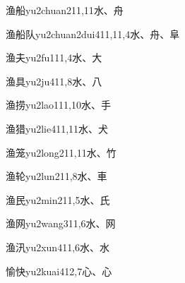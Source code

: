 \begin{entry}{渔船}{yu2chuan2}{11,11}{⽔、⾈}
\end{entry}

\begin{entry}{渔船队}{yu2chuan2dui4}{11,11,4}{⽔、⾈、⾩}
\end{entry}

\begin{entry}{渔夫}{yu2fu1}{11,4}{⽔、⼤}
\end{entry}

\begin{entry}{渔具}{yu2ju4}{11,8}{⽔、⼋}
\end{entry}

\begin{entry}{渔捞}{yu2lao1}{11,10}{⽔、⼿}
\end{entry}

\begin{entry}{渔猎}{yu2lie4}{11,11}{⽔、⽝}
\end{entry}

\begin{entry}{渔笼}{yu2long2}{11,11}{⽔、⽵}
\end{entry}

\begin{entry}{渔轮}{yu2lun2}{11,8}{⽔、⾞}
\end{entry}

\begin{entry}{渔民}{yu2min2}{11,5}{⽔、⽒}
\end{entry}

\begin{entry}{渔网}{yu2wang3}{11,6}{⽔、⽹}
\end{entry}

\begin{entry}{渔汛}{yu2xun4}{11,6}{⽔、⽔}
\end{entry}

\begin{entry}{愉快}{yu2kuai4}{12,7}{⼼、⼼}
\end{entry}

